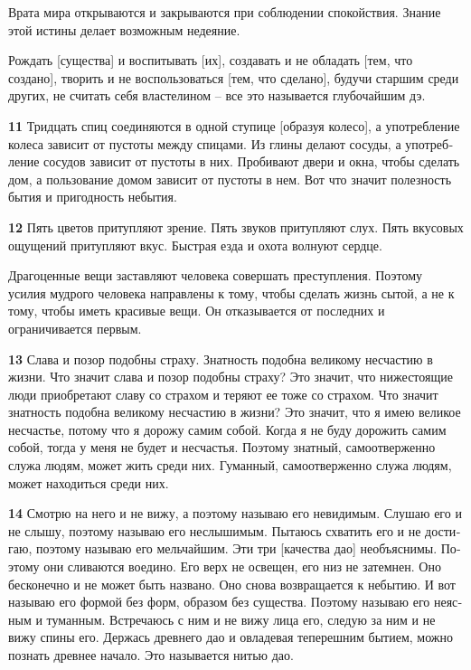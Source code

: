 \documentclass[a4paper]{article}
\begin{document}
{
Врата мира открываются и закрываются при соблюдении спокойствия. Знание этой истины делает возможным недеяние.}

{
Рождать [существа] и воспитывать [их], создавать и не обладать [тем, что создано], творить и не воспользоваться [тем,
что сделано], будучи старшим среди других, не считать себя властелином – все это называется глубочайшим дэ.}

{\ttfamily
\foreignlanguage{russian}{\textrm{\textbf{11}}}\foreignlanguage{russian}{\textrm{ Тридцать спиц соединяются в одной
ступице [образуя колесо], а употребление колеса зависит от пустоты между спицами. Из глины делают сосуды, а
употребление сосудов зависит от пустоты в них. Пробивают двери и окна, чтобы сделать дом, а пользование домом зависит
от пустоты в нем. Вот что значит полезность бытия и пригодность небытия.}}}

{\ttfamily
\foreignlanguage{russian}{\textrm{\textbf{12}}}\foreignlanguage{russian}{\textrm{ Пять цветов притупляют зрение. Пять
звуков притупляют слух. Пять вкусовых ощущений притупляют вкус. Быстрая езда и охота волнуют сердце.}}}

{
Драгоценные вещи заставляют человека совершать преступления. Поэтому усилия мудрого человека направлены к тому, чтобы
сделать жизнь сытой, а не к тому, чтобы иметь красивые вещи. Он отказывается от последних и ограничивается первым.}

{\ttfamily
\foreignlanguage{russian}{\textrm{\textbf{13}}}\foreignlanguage{russian}{\textrm{ Слава и позор подобны страху.
Знатность подобна великому несчастию в жизни. Что значит слава и позор подобны страху? Это значит, что нижестоящие люди
приобретают славу со страхом и теряют ее тоже со страхом. Что значит знатность подобна великому несчастию в жизни? Это
значит, что я имею великое несчастье, потому что я дорожу самим собой. Когда я не буду дорожить самим собой, тогда у
меня не будет и несчастья. Поэтому знатный, самоотверженно служа людям, может жить среди них. Гуманный, самоотверженно
служа людям, может находиться среди них.}}}

{\ttfamily
\foreignlanguage{russian}{\textrm{\textbf{14}}}\foreignlanguage{russian}{\textrm{ Смотрю на него и не вижу, а поэтому
называю его невидимым. Слушаю его и не слышу, поэтому называю его неслышимым. Пытаюсь схватить его и не достигаю,
поэтому называю его мельчайшим. Эти три [качества дао] необъяснимы. Поэтому они сливаются воедино. Его верх не освещен,
его низ не затемнен. Оно бесконечно и не может быть названо. Оно снова возвращается к небытию. И вот называю его формой
без форм, образом без существа. Поэтому называю его неясным и туманным. Встречаюсь с ним и не вижу лица его, следую за
ним и не вижу спины его. Держась древнего дао и овладевая теперешним бытием, можно познать древнее начало. Это
называется нитью дао.}}}
\end{document}
